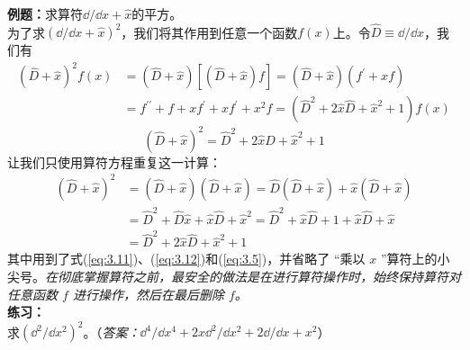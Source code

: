 	\begin{examplebox}
		\textbf{例题：}求算符$\dd /\dd x+\hat{x}$的平方。\\
		
		为了求$\left(\dd /\dd x+\hat{x}\right)^2$，我们将其作用到任意一个函数$f\left(x\right)$上。令$\hat{D} \equiv \dd /\dd x$，我们有
		\begin{equation*}
			\begin{aligned}
				\left(\hat{D}+\hat{x}\right)^2f\left(x\right) & = \left(\hat{D}+\hat{x}\right)\left[\left(\hat{D}+\hat{x}\right)f\right] = \left(\hat{D}+\hat{x}\right)\left(f^{\prime}+xf\right) \\
				& = f^{\prime \prime}+f+xf^{\prime}+xf^{\prime}+x^2f=\left(\hat{D}^2+2\hat{x}\hat{D}+\hat{x}^2+1\right)f\left(x\right)
			\end{aligned}
		\end{equation*}
		\begin{equation*}
			\left(\hat{D}+\hat{x}\right)^2 = \hat{D}^2+2\hat{x}\hat{D}+\hat{x}^2+1
		\end{equation*}
		让我们只使用算符方程重复这一计算：
		\begin{equation*}
			\begin{aligned}
				\left(\hat{D}+\hat{x}\right)^2 & = \left(\hat{D}+\hat{x}\right)\left(\hat{D}+\hat{x}\right) = \hat{D}\left(\hat{D}+\hat{x}\right)+\hat{x}\left(\hat{D}+\hat{x}\right) \\
				& = \hat{D}^2+\hat{D}\hat{x}+\hat{x}\hat{D}+\hat{x}^2 = \hat{D}^2+\hat{x}\hat{D}+1+\hat{x}\hat{D}+\hat{x} \\
				& = \hat{D}^2+2\hat{x}\hat{D}+\hat{x}^2+1
			\end{aligned}
		\end{equation*}
		其中用到了式(\ref{eq:3.11})、(\ref{eq:3.12})和(\ref{eq:3.5})，并省略了 “乘以 $x$ ”算符上的小尖号。\textit{在彻底掌握算符之前，最安全的做法是在进行算符操作时，始终保持算符对任意函数 $f$ 进行操作，然后在最后删除 $f$。}\\
		
		\textbf{练习：}\\
		求$\left(\dd ^2/\dd x^2\right)^2$。（\textit{答案：}$\dd ^4/\dd x^4+2x\dd ^2/\dd x^2+2\dd /\dd x+x^2$）
	\end{examplebox}
	
